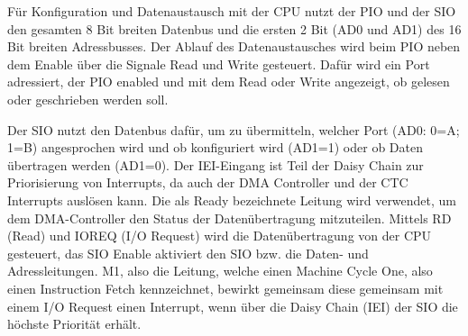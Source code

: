 Für Konfiguration und Datenaustausch mit der CPU nutzt der PIO und der SIO den gesamten 8 Bit breiten Datenbus und die ersten 2 Bit (AD0 und AD1) des 16 Bit breiten Adressbusses. Der Ablauf des Datenaustausches wird beim PIO neben dem Enable über die Signale Read und Write gesteuert. Dafür wird ein Port adressiert, der PIO enabled und mit dem Read oder Write angezeigt, ob gelesen oder geschrieben werden soll.

Der SIO nutzt den Datenbus dafür, um zu übermitteln, welcher Port (AD0: 0=A; 1=B) angesprochen wird und ob konfiguriert wird (AD1=1) oder ob Daten übertragen werden (AD1=0). Der IEI-Eingang ist Teil der Daisy Chain zur Priorisierung von Interrupts, da auch der DMA Controller und der CTC Interrupts auslösen kann. Die als Ready bezeichnete Leitung wird verwendet, um dem DMA-Controller den Status der Datenübertragung mitzuteilen. Mittels RD (Read) und IOREQ (I/O Request) wird die Datenübertragung von der CPU gesteuert, das SIO Enable aktiviert den SIO bzw. die Daten- und Adressleitungen. M1, also die Leitung, welche einen Machine Cycle One, also einen Instruction Fetch kennzeichnet, bewirkt gemeinsam diese gemeinsam mit einem I/O Request einen Interrupt, wenn über die Daisy Chain (IEI) der SIO die höchste Priorität erhält.

